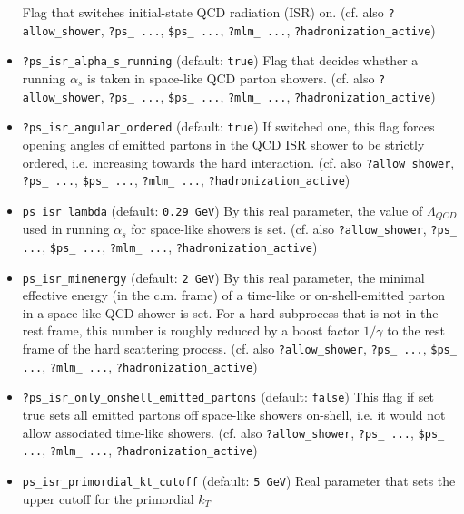 \documentclass[12pt]{book}
\newcommand{\ttt}[1]{\texttt{#1}}
\begin{document}
\begin{itemize}
Flag that switches initial-state QCD radiation (ISR) on.  (cf. also
\ttt{?allow\_shower}, \ttt{?ps\_ ...}, \ttt{\$ps\_ ...}, \ttt{?mlm\_
...}, \ttt{?hadronization\_active})  
\item
\ttt{?ps\_isr\_alpha\_s\_running} \qquad (default: \ttt{true})
\newline
Flag that decides whether a running $\alpha_s$ is taken in space-like
QCD parton showers. (cf. also \ttt{?allow\_shower}, \ttt{?ps\_ ...},
\ttt{\$ps\_ ...}, \ttt{?mlm\_ ...}, \ttt{?hadronization\_active})  
\item
\ttt{?ps\_isr\_angular\_ordered} \qquad (default: \ttt{true}) \newline 
If switched one, this flag forces opening angles of emitted partons in
the QCD ISR shower to be strictly ordered, i.e. increasing towards the
hard interaction.  (cf. also \ttt{?allow\_shower}, \ttt{?ps\_ ...},
\ttt{\$ps\_ ...}, \ttt{?mlm\_ ...}, \ttt{?hadronization\_active})  
\item
\ttt{ps\_isr\_lambda} \qquad (default: \ttt{0.29 GeV}) \newline
By this real parameter, the value of $\Lambda_{QCD}$ used in running
$\alpha_s$ for space-like showers is set. (cf. also
\ttt{?allow\_shower}, \ttt{?ps\_   ...}, \ttt{\$ps\_ ...}, \ttt{?mlm\_
  ...}, \ttt{?hadronization\_active})   
\item
\ttt{ps\_isr\_minenergy} \qquad (default: \ttt{2 GeV}) \newline
By this real parameter, the minimal effective energy (in the
c.m. frame) of a time-like or on-shell-emitted parton in a space-like
QCD shower is set. For a hard subprocess that is not in the rest frame,
this number is roughly reduced by a boost factor $1/\gamma$ to the
rest frame of the hard scattering process.  (cf. also
\ttt{?allow\_shower}, \ttt{?ps\_   ...}, \ttt{\$ps\_ ...}, \ttt{?mlm\_
  ...}, \ttt{?hadronization\_active})   
\item
\ttt{?ps\_isr\_only\_onshell\_emitted\_partons} \qquad (default:
\ttt{false}) \newline
This flag if set true sets all emitted partons off space-like showers
on-shell, i.e. it would not allow associated time-like showers.  (cf. also
\ttt{?allow\_shower}, \ttt{?ps\_   ...}, \ttt{\$ps\_ ...}, \ttt{?mlm\_
  ...}, \ttt{?hadronization\_active})   
\item
\ttt{ps\_isr\_primordial\_kt\_cutoff} \qquad (default: \ttt{5
GeV}) \newline
Real parameter that sets the upper cutoff for the primordial $k_T$

\end{itemize}
\end{document}
